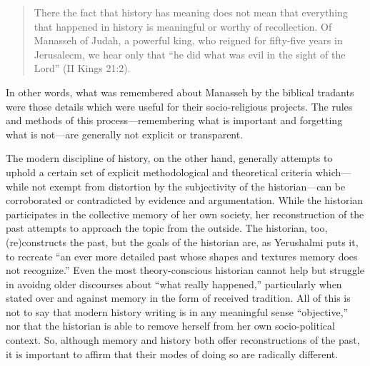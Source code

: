\begin{quote}
There the fact that history has meaning does not mean that everything
that happened in history is meaningful or worthy of recollection. Of
Manasseh of Judah, a powerful king, who reigned for fifty-five years in
Jerusalecm, we hear only that ``he did what was evil in the sight of the
Lord'' (II Kings 21:2).\autocite[10]{yerushalmi1989}
\end{quote}

In other words, what was remembered about Manasseh by the biblical
tradants were those details which were useful for their socio-religious
projects. The rules and methods of this process---remembering what is
important and forgetting what is not---are generally not explicit or
transparent.

The modern discipline of history, on the other hand, generally attempts
to uphold a certain set of explicit methodological and theoretical
criteria which---while not exempt from distortion by the subjectivity of
the historian---can be corroborated or contradicted by evidence and
argumentation.\autocite[As Daniel Pioske puts it, ``What separates the
act of historiography from the recounting of a culture's sanctioned
memories is consequently the historians' determination to isolate and
compare disparate testimonies about the past with other past traces that
may corroborate or discredit their
claims.''][302--303]{pioske_bibint2015} While the historian participates
in the collective memory of her own society, her reconstruction of the
past attempts to approach the topic from the outside. The historian,
too, (re)constructs the past, but the goals of the historian are, as
Yerushalmi puts it, to recreate ``an ever more detailed past whose
shapes and textures memory does not
recognize.''\autocites[94]{yerushalmi1989}[See
also][532]{verovsek_pgi2016} Even the most theory-conscious historian
cannot help but struggle in avoidng older discourses about ``what really
happened,'' particularly when stated over and against memory in the form
of received tradition. All of this is not to say that modern history
writing is in any meaningful sense ``objective,'' nor that the historian
is able to remove herself from her own socio-political context. So,
although memory and history both offer reconstructions of the past, it
is important to affirm that their modes of doing so are radically
different.\autocite[Pioske observes, ``The epistemological tension
observed by Ricoeur between memory and history is thus understood as the
outcome of two processes that, though having the similar intent of
re-presenting former phenomena, nevertheless pursue and mediate the past
through quite disparate means.''][302]{pioske_bibint2015}

